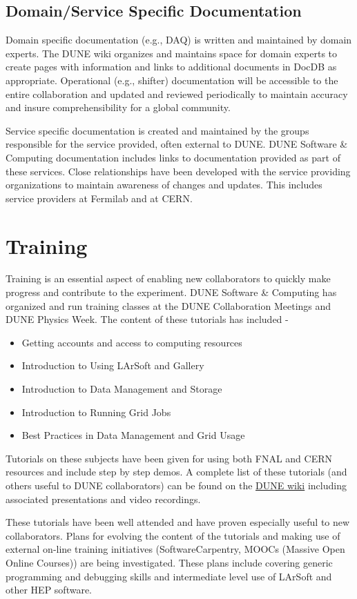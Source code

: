 \subsection{Domain/Service Specific Documentation}
Domain specific documentation (e.g., DAQ) is written and maintained by domain experts.  The DUNE wiki organizes and maintains space for domain experts to create pages with information and links to additional documents in DocDB as appropriate. Operational (e.g., shifter) documentation will be accessible to the entire collaboration and updated and reviewed periodically to maintain accuracy and insure comprehensibility for a global community. 

Service specific documentation is created and maintained by the groups responsible for the service provided, often external to DUNE.  DUNE Software \& Computing documentation includes links to documentation provided as part of these services. Close relationships have been developed with the service providing organizations to maintain awareness of changes and updates.  This includes service providers at Fermilab and at CERN.

\section{Training}
Training is an essential aspect of enabling new collaborators to quickly make progress and contribute to the experiment.  DUNE Software \& Computing has organized and run training classes at the DUNE Collaboration Meetings and DUNE Physics Week.  The content of these tutorials has included -
\begin{itemize}
\item Getting accounts and access to computing resources
\item Introduction to Using LArSoft and Gallery
\item Introduction to Data Management and Storage
\item Introduction to Running Grid Jobs
\item Best Practices in Data Management and Grid Usage
\end{itemize}
Tutorials on these subjects have been given for using both FNAL and CERN resources and include step by step demos.  A complete list of these tutorials (and others useful to DUNE collaborators) can be found on the \href{https://wiki.dunescience.org/wiki/DUNE_Computing/List_of_DUNE_Tutorials,_LArSoft_Workshops,_etc,_etc,_etc}{DUNE wiki} including associated presentations and video recordings.

These tutorials have been well attended and have proven especially useful to new collaborators.  Plans for evolving the content of the tutorials and making use of external on-line training initiatives (SoftwareCarpentry, MOOCs (Massive Open Online Courses)) are being investigated.  These plans include covering generic programming and debugging skills and intermediate level use of LArSoft and other HEP software. 

